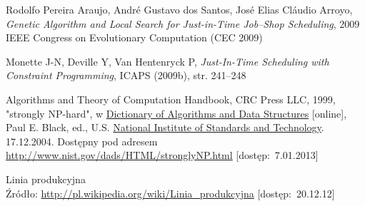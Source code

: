 \documentclass[twoside]{kInzynierka}
\begin{document}
\begin{thebibliography}{99}
Rodolfo Pereira Araujo, André Gustavo dos Santos, José Elias Cláudio Arroyo,
\emph{Genetic Algorithm and Local Search for Just-in-Time Job–Shop Scheduling},
2009 IEEE Congress on Evolutionary Computation (CEC 2009)

\newpage

Monette J-N, Deville Y, Van Hentenryck P,
\emph{Just-In-Time Scheduling with Constraint Programming},
ICAPS (2009b), str. 241–248

Algorithms and Theory of Computation Handbook, CRC Press LLC, 1999, "strongly NP-hard", w \href{http://xlinux.nist.gov/dads/}{Dictionary of Algorithms and Data Structures} [online], Paul E. Black, ed., U.S. \href{http://www.nist.gov/}{National Institute of Standards and Technology}. 17.12.2004. Dostępny pod adresem \url{http://www.nist.gov/dads/HTML/stronglyNP.html} [dostęp:~7.01.2013]


Linia produkcyjna \\
Źródło: \url{http://pl.wikipedia.org/wiki/Linia_produkcyjna} [dostęp:~20.12.12]


\end{thebibliography}
       
%   
\end{document}
